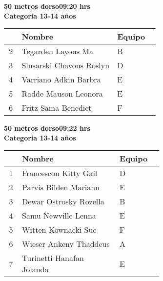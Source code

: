 \begin{minipage}{0.95\linewidth}\vspace{0.5cm} 
\begin{flushleft}
\textbf{
\hspace{-0.15cm}50 metros dorso\hspace{1.5cm}09:20 hrs \\Categoria 13-14 años}\vspace{-0.2cm} 
\end{flushleft}
\begin{tabular}{cp{0.63\linewidth}l}
\hline
& \textbf{Nombre} & \textbf{Equipo} \\ \hline
2 & Tegarden Layous Ma & B \\ 
3 & Slusarski Chavous Roslyn & D \\ 
4 & Varriano Adkin Barbra & E \\ 
5 & Radde Mauson Leonora & E \\ 
6 & Fritz Sama Benedict & F \\ 
\end{tabular}
\end{minipage}
\begin{minipage}{0.95\linewidth}\vspace{0.5cm} 
\begin{flushleft}
\textbf{
\hspace{-0.15cm}50 metros dorso\hspace{1.5cm}09:22 hrs \\Categoria 13-14 años}\vspace{-0.2cm} 
\end{flushleft}
\begin{tabular}{cp{0.63\linewidth}l}
\hline
& \textbf{Nombre} & \textbf{Equipo} \\ \hline
1 & Francescon Kitty Gail & D \\ 
2 & Parvis Bilden Mariann & E \\ 
3 & Dewar Ostrosky Rozella & B \\ 
4 & Samu Newville Lenna & E \\ 
5 & Witten Kownacki Sue & F \\ 
6 & Wieser Ankeny Thaddeus & A \\ 
7 & Turinetti Hanafan Jolanda & E \\ 
\end{tabular}
\end{minipage}
